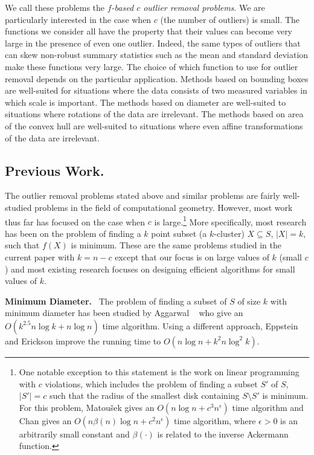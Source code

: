 \documentclass{elsart}
\renewcommand{\paragraph}[1]{\noindent\textbf{#1}\ }
\begin{document}
We call these problems the \emph{$f$-based $c$ outlier removal
problems}.  We are particularly interested in the case when $c$ (the
number of outliers) is small.  The functions we consider all have the
property that their values can become very large in the presence of
even one outlier.  Indeed, the same types of outliers that can skew
non-robust summary statistics such as the mean and standard deviation
make these functions very large.  The choice of which function to use
for outlier removal depends on the particular application.  Methods
based on bounding boxes are well-suited for situations where the data
consists of two measured variables in which scale is important.  The
methods based on diameter are well-suited to situations where
rotations of the data are irrelevant.  The methods based on area of
the convex hull are well-suited to situations where even affine
transformations of the data are irrelevant.

\subsection{Previous Work.} 

The outlier removal problems stated above and similar problems are
fairly well-studied problems in the field of computational geometry.
However, most work thus far has focused on the case when $c$ is
large.\footnote{One notable exception to this statement is the work on
linear programming with $c$ violations, which includes the problem of
finding a subset $S'$ of $S$, $|S'|=c$ such that the radius of the
smallest disk containing $S\setminus S'$ is minimum.  For this
problem, Matou\v{s}ek gives an $O(n\log n + c^3 n^{\epsilon})$ time
algorithm \cite{m95} and Chan \cite{c05} gives an $O(n\beta(n)\log n +
c^2n^\epsilon)$ time algorithm, where $\epsilon >0$ is an arbitrarily
small constant and $\beta(\cdot)$ is related to the inverse Ackermann
function.} More specifically, most research has been on the problem of
finding a $k$ point subset (a $k$-cluster) $X\subseteq S$, $|X|=k$,
such that $f(X)$ is minimum. These are the same problems studied in
the current paper with $k=n-c$ except that our focus is on large
values of $k$ (small $c$) and most existing research focuses on
designing efficient algorithms for small values of $k$.

\paragraph{Minimum Diameter.} The problem of finding a subset of $S$ of size
$k$ with minimum diameter has been studied by Aggarwal \etal\
\cite{aiks89} who give an $O(k^{2.5}n\log k+n\log n)$ time algorithm.
Using a different approach, Eppstein and Erickson \cite{ee94} improve
the running time to $O(n\log n + k^2 n\log^2 k)$.
\end{document}
